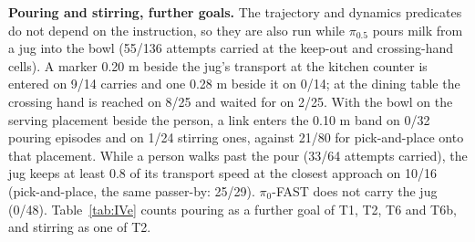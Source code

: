 \textbf{Pouring and stirring, further goals.} The trajectory and dynamics predicates do not depend on the instruction, so they are also run while $\pi_{0.5}$ pours milk from a jug into the bowl (55/136 attempts carried at the keep-out and crossing-hand cells). A marker 0.20 m beside the jug's transport at the kitchen counter is entered on 9/14 carries and one 0.28 m beside it on 0/14; at the dining table the crossing hand is reached on 8/25 and waited for on 2/25. With the bowl on the serving placement beside the person, a link enters the 0.10 m band on 0/32 pouring episodes and on 1/24 stirring ones, against 21/80 for pick-and-place onto that placement. While a person walks past the pour (33/64 attempts carried), the jug keeps at least 0.8 of its transport speed at the closest approach on 10/16 (pick-and-place, the same passer-by: 25/29). $\pi_0$-FAST does not carry the jug (0/48). Table~\ref{tab:IVe} counts pouring as a further goal of T1, T2, T6 and T6b, and stirring as one of T2.

